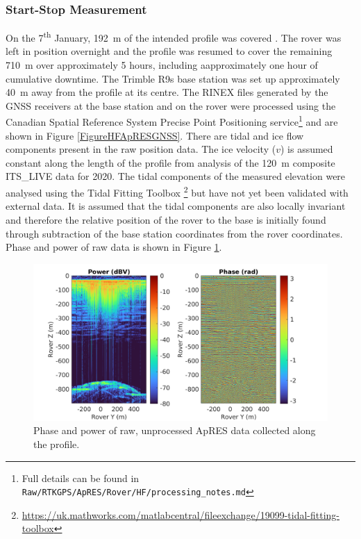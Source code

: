 \documentclass[a4paper,12pt]{article}
\begin{document}
\subsubsection{Start-Stop Measurement}
On the 7\textsuperscript{th} January, \SI{192}{\metre} of the intended profile
was covered .  The rover was left in position overnight and the profile was
resumed to cover the remaining \SI{710}{\metre} over approximately 5 hours,
including aapproximately one hour of cumulative downtime. The Trimble R9s base
station was set up approximately \SI{40}{\metre} away from the profile at its
centre.  The RINEX files generated by the GNSS receivers at the base station and
on the rover were processed using the Canadian Spatial Reference System Precise
Point Positioning service\footnote{Full details can be found in
\texttt{Raw/RTKGPS/ApRES/Rover/HF/processing\_notes.md}} and are shown in Figure 
\ref{FigureHFApRESGNSS}.  There are tidal and ice flow components present in the
raw position data.  The ice velocity ($v$) is assumed constant along the length
of the profile from analysis of the \SI{120}{\metre} composite ITS\_LIVE data
for 2020.  The tidal components of the measured elevation were analysed using
the Tidal Fitting Toolbox \footnote{\url{https://uk.mathworks.com/matlabcentral/fileexchange/19099-tidal-fitting-toolbox}}
but have not yet been validated with external data.  It is assumed that the
tidal components are also locally invariant and therefore the relative position
of the rover to the base is initially found through subtraction of the base
station coordinates from the rover coordinates. Phase and power of raw data is 
shown in Figure \ref{FigureHFApRESRaw}.

\begin{figure}[h!]
  \centering 
  \includegraphics{../../Doc/ApRES/Rover/HF/StartStop/StartStopRawData.png}
  \caption{Phase and power of raw, unprocessed ApRES data collected along the
  profile.}
  \label{FigureHFApRESRaw}
\end{figure}
\end{document}
